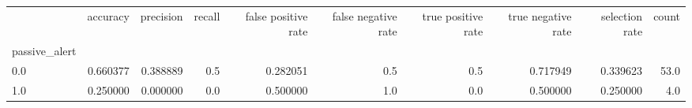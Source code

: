 \begin{tabular}{lrrrrrrrrr}
\toprule
{} &  accuracy &  precision &  recall &  false positive rate &  false negative rate &  true positive rate &  true negative rate &  selection rate &  count \\
passive\_alert &           &            &         &                      &                      &                     &                     &                 &        \\
\midrule
0.0           &  0.660377 &   0.388889 &     0.5 &             0.282051 &                  0.5 &                 0.5 &            0.717949 &        0.339623 &   53.0 \\
1.0           &  0.250000 &   0.000000 &     0.0 &             0.500000 &                  1.0 &                 0.0 &            0.500000 &        0.250000 &    4.0 \\
\bottomrule
\end{tabular}
